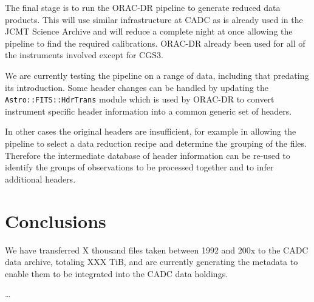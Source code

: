 \documentclass[11pt,twoside]{article}
\begin{document}
The final stage is to run the ORAC-DR pipeline
\citep{1999ASPC..172...11E,2008AN....329..295C}
to generate reduced
data products.
This will use similar infrastructure at CADC as is already
used in the JCMT Science Archive
\citep{2011ASPC..442..203E}
and will reduce a complete night at once allowing
the pipeline to find the required calibrations.
ORAC-DR already been used for all of the instruments
involved except for CGS3.

We are currently testing the pipeline on a range of data,
including that predating its introduction.
Some header changes can be handled by updating the
\texttt{Astro::FITS::HdrTrans} module
\citep[section 2.2]{2008AN....329..295C}
which is used by ORAC-DR to convert
instrument specific header information into
a common generic set of headers.

In other cases the original headers are insufficient,
for example in allowing the pipeline to
select a data reduction recipe and determine the
grouping of the files.
Therefore the intermediate database of header information
can be re-used to identify
the groups of observations to be processed together and to infer
additional headers.


\section{Conclusions}

We have transferred X thousand files taken between 1992 and 200x to
the CADC data archive, totaling XXX TiB, and are currently generating
the metadata to enable them to be integrated into the CADC data
holdings.

\ldots


\end{document}
